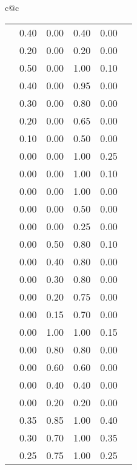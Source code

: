 \begin{table}[!ht]
\begin{center}
\begin{scriptsize}
\begin{tabular}{c@{\quad}c}
\begin{tabular}{|c|c|cccc|}
\clrow{lightgreen}              & 0.40 & 0.00 & 0.40 & 0.00 \\
\clrow{verylightgreen}          & 0.20 & 0.00 & 0.20 & 0.00 \\
\clspc
\clrow{verydarklimegreen}       & 0.50 & 0.00 & 1.00 & 0.10 \\
\clrow{darklimegreen}           & 0.40 & 0.00 & 0.95 & 0.00 \\
\clrow{limegreen}               & 0.30 & 0.00 & 0.80 & 0.00 \\
\clrow{lightlimegreen}          & 0.20 & 0.00 & 0.65 & 0.00 \\
\clrow{verylightlimegreen}      & 0.10 & 0.00 & 0.50 & 0.00 \\
\clspc
\clrow{verydarkyellow}          & 0.00 & 0.00 & 1.00 & 0.25 \\
\clrow{darkyellow}              & 0.00 & 0.00 & 1.00 & 0.10 \\
\clrow{yellow}                  & 0.00 & 0.00 & 1.00 & 0.00 \\
\clrow{lightyellow}             & 0.00 & 0.00 & 0.50 & 0.00 \\
\clrow{verylightyellow}         & 0.00 & 0.00 & 0.25 & 0.00 \\
\clspc
\clrow{verydarkorange}          & 0.00 & 0.50 & 0.80 & 0.10 \\
\clrow{darkorange}              & 0.00 & 0.40 & 0.80 & 0.00 \\
\clrow{orange}                  & 0.00 & 0.30 & 0.80 & 0.00 \\
\clrow{lightorange}             & 0.00 & 0.20 & 0.75 & 0.00 \\
\clrow{verylightorange}         & 0.00 & 0.15 & 0.70 & 0.00 \\
\clspc
\clrow{verydarkred}             & 0.00 & 1.00 & 1.00 & 0.15 \\
\clrow{darkred}                 & 0.00 & 0.80 & 0.80 & 0.00 \\
\clrow{red}                     & 0.00 & 0.60 & 0.60 & 0.00 \\
\clrow{lightred}                & 0.00 & 0.40 & 0.40 & 0.00 \\
\clrow{verylightred}            & 0.00 & 0.20 & 0.20 & 0.00 \\
\clspc
\clrow{verydarkbrown}           & 0.35 & 0.85 & 1.00 & 0.40 \\
\clrow{darkbrown}               & 0.30 & 0.70 & 1.00 & 0.35 \\
\clrow{brown}                   & 0.25 & 0.75 & 1.00 & 0.25 \\

\end{tabular}
\end{tabular}
\end{scriptsize}
\end{center}
\end{table}
